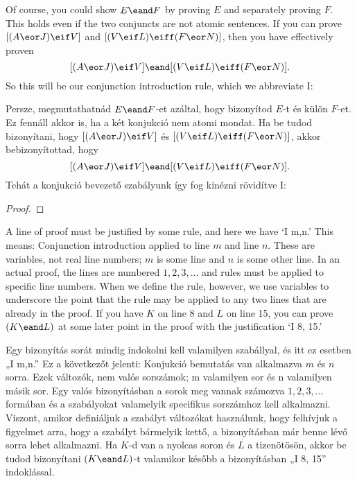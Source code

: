 Of course, you could show $E \eand F$ by proving $E$ and separately proving $F$. 
This holds even if the two conjuncts are not atomic sentences. If you can prove $[(A \eor J) \eif V]$ and  $[(V \eif L) \eiff (F \eor N)]$, then you have effectively proven
$$[(A \eor J) \eif V] \eand [(V \eif L) \eiff (F \eor N)].$$
So this will be our conjunction introduction rule, which we abbreviate {\eand}I:

Persze, megmutathatnád $E \eand F$-et azáltal, hogy bizonyítod $E$-t és külön $F$-et.
Ez fennáll akkor is, ha a két konjukció nem atomi mondat. Ha be tudod bizonyítani, hogy  $[(A \eor J) \eif V]$ és  $[(V \eif L) \eiff (F \eor N)]$, akkor bebizonyítottad, hogy
$$[(A \eor J) \eif V] \eand [(V \eif L) \eiff (F \eor N)].$$
Tehát a konjukció bevezető szabályunk így fog kinézni rövidítve {\eand}I:
 
\begin{proof}
	 
\end{proof}

A line of proof must be justified by some rule, and here we have `{\eand}I m,n.' This means: Conjunction introduction applied to line $m$ and line $n$. These are variables, not real line numbers; $m$ is some line and $n$ is some other line. In an actual proof, the lines are numbered $1, 2, 3, \ldots$ and rules must be applied to specific line numbers. When we define the rule, however, we use variables to underscore the point that the rule may be applied to any two lines that are already in the proof. If you have $K$ on line 8 and $L$ on line 15, you can prove $(K\eand L)$ at some later point in the proof with the justification `{\eand}I 8, 15.'

Egy bizonyítás sorát mindig indokolni kell valamilyen szabállyal, és itt ez esetben „{\eand}I m,n.”
Ez a következőt jelenti: Konjukció bemutatás van alkalmazva $m$ és $n$ sorra. Ezek változók, nem valós sorszámok; m valamilyen sor és n valamilyen másik sor. Egy valós bizonyításban a sorok meg vannak számozva $1, 2, 3, \ldots$ formában és a szabályokat valamelyik specifikus sorszámhoz kell alkalmazni. Viszont, amikor definiáljuk a szabályt változókat használunk, hogy felhívjuk a figyelmet arra, hogy a szabályt bármelyik kettő, a bizonyításban már benne lévő sorra lehet alkalmazni. Ha $K$-d van a nyolcas soron és $L$ a tizenötösön, akkor be tudod bizonyítani $(K\eand L)$-t valamikor később a bizonyításban „{\eand}I 8, 15” indoklással.

